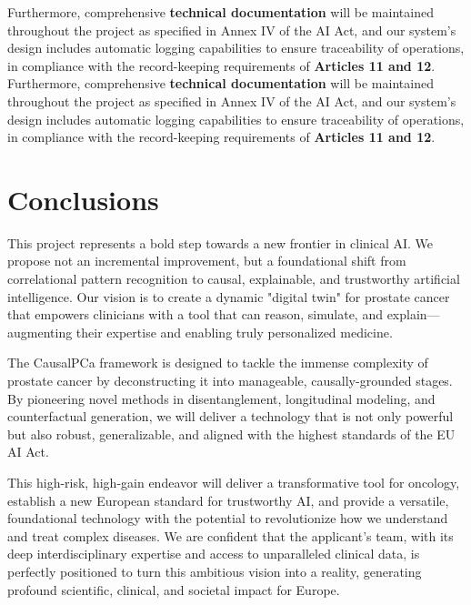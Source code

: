 \documentclass[11pt, a4paper]{article}
\begin{document}
Furthermore, comprehensive \textbf{technical documentation} will be maintained throughout the project as specified in Annex IV of the AI Act, and our system's design includes automatic logging capabilities to ensure traceability of operations, in compliance with the record-keeping requirements of \textbf{Articles 11 and 12}.
Furthermore, comprehensive \textbf{technical documentation} will be maintained throughout the project as specified in Annex IV of the AI Act, and our system's design includes automatic logging capabilities to ensure traceability of operations, in compliance with the record-keeping requirements of \textbf{Articles 11 and 12}.

\section{Conclusions}
This project represents a bold step towards a new frontier in clinical AI. We propose not an incremental improvement, but a foundational shift from correlational pattern recognition to causal, explainable, and trustworthy artificial intelligence. Our vision is to create a dynamic "digital twin" for prostate cancer that empowers clinicians with a tool that can reason, simulate, and explain—augmenting their expertise and enabling truly personalized medicine.

The CausalPCa framework is designed to tackle the immense complexity of prostate cancer by deconstructing it into manageable, causally-grounded stages. By pioneering novel methods in disentanglement, longitudinal modeling, and counterfactual generation, we will deliver a technology that is not only powerful but also robust, generalizable, and aligned with the highest standards of the EU AI Act.

This high-risk, high-gain endeavor will deliver a transformative tool for oncology, establish a new European standard for trustworthy AI, and provide a versatile, foundational technology with the potential to revolutionize how we understand and treat complex diseases. We are confident that the applicant's team, with its deep interdisciplinary expertise and access to unparalleled clinical data, is perfectly positioned to turn this ambitious vision into a reality, generating profound scientific, clinical, and societal impact for Europe.



\end{document}
